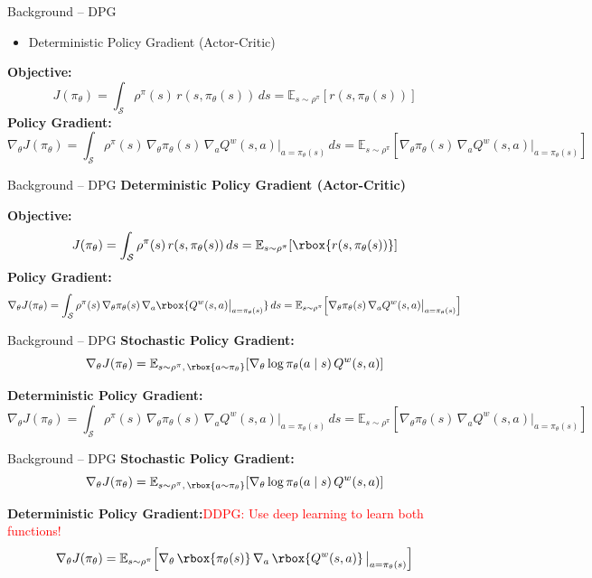 \begin{frame}{Background -- DPG}
\begin{itemize}
    \item Deterministic Policy Gradient (Actor-Critic)
\end{itemize}
\textbf{Objective:}
\[
J(\pi_\theta) = \int_{\mathcal{S}} \rho^{\pi}(s)\, r(s, \pi_\theta(s))\, ds = \mathbb{E}_{s \sim \rho^\pi}\!\left[ r(s, \pi_\theta(s)) \right]
\]
\textbf{Policy Gradient:}
\[
\nabla_\theta J(\pi_\theta) = \int_{\mathcal{S}} \rho^{\pi}(s)\, \nabla_\theta \pi_\theta(s)\, \nabla_a Q^{w}(s, a)\big|_{a=\pi_\theta(s)}\, ds = \mathbb{E}_{s \sim \rho^\pi}\!\left[ \nabla_\theta \pi_\theta(s)\, \nabla_a Q^{w}(s, a)\big|_{a=\pi_\theta(s)} \right]
\]
\end{frame}

\begin{frame}{Background -- DPG}
\textbf{Deterministic Policy Gradient (Actor-Critic)}
\vspace{0.5em}

\textbf{Objective:}
\[
J(\pi_\theta) = \int_{\mathcal{S}} \rho^{\pi}(s)\, r(s, \pi_\theta(s))\, ds = \mathbb{E}_{s \sim \rho^\pi}\!\left[ \rbox{r(s, \pi_\theta(s))} \right]
\]
\textbf{Policy Gradient:}
\[
\nabla_\theta J(\pi_\theta) = \int_{\mathcal{S}} \rho^{\pi}(s)\, \nabla_\theta \pi_\theta(s)\, \nabla_a \rbox{Q^{w}(s, a)\big|_{a=\pi_\theta(s)}}\, ds = \mathbb{E}_{s \sim \rho^\pi}\!\left[ \nabla_\theta \pi_\theta(s)\, \nabla_a Q^{w}(s, a)\big|_{a=\pi_\theta(s)} \right]
\]
\end{frame}
\begin{frame}{Background -- DPG}
\textbf{Stochastic Policy Gradient:}
\[
\nabla_\theta J(\pi_\theta) = \mathbb{E}_{s \sim \rho^\pi,\, \rbox{a \sim \pi_\theta}}\!\left[ \nabla_\theta \log \pi_\theta(a \mid s)\, Q^{w}(s, a) \right]
\]

\textbf{Deterministic Policy Gradient:}
\[
\nabla_\theta J(\pi_\theta) = \int_{\mathcal{S}} \rho^{\pi}(s)\, \nabla_\theta \pi_\theta(s)\, \nabla_a Q^{w}(s, a)\big|_{a=\pi_\theta(s)}\, ds = \mathbb{E}_{s \sim \rho^\pi}\!\left[ \nabla_\theta \pi_\theta(s)\, \nabla_a Q^{w}(s, a)\big|_{a=\pi_\theta(s)} \right]
\]
\end{frame}

\begin{frame}{Background -- DPG}
\textbf{Stochastic Policy Gradient:}
\[
\nabla_\theta J(\pi_\theta) = \mathbb{E}_{s \sim \rho^\pi,\, \rbox{a \sim \pi_\theta}}\!\left[ \nabla_\theta \log \pi_\theta(a \mid s)\, Q^{w}(s, a) \right]
\]

\textbf{Deterministic Policy Gradient:}\hfill\textcolor{red}{\footnotesize DDPG: Use deep learning to learn both functions!}
\[
\nabla_\theta J(\pi_\theta) = \mathbb{E}_{s \sim \rho^\pi}\!\left[ \nabla_\theta\, \rbox{\pi_\theta(s)}\, \nabla_a\, \rbox{Q^{w}(s, a)}\,\big|_{a=\pi_\theta(s)} \right]
\]
\end{frame}
